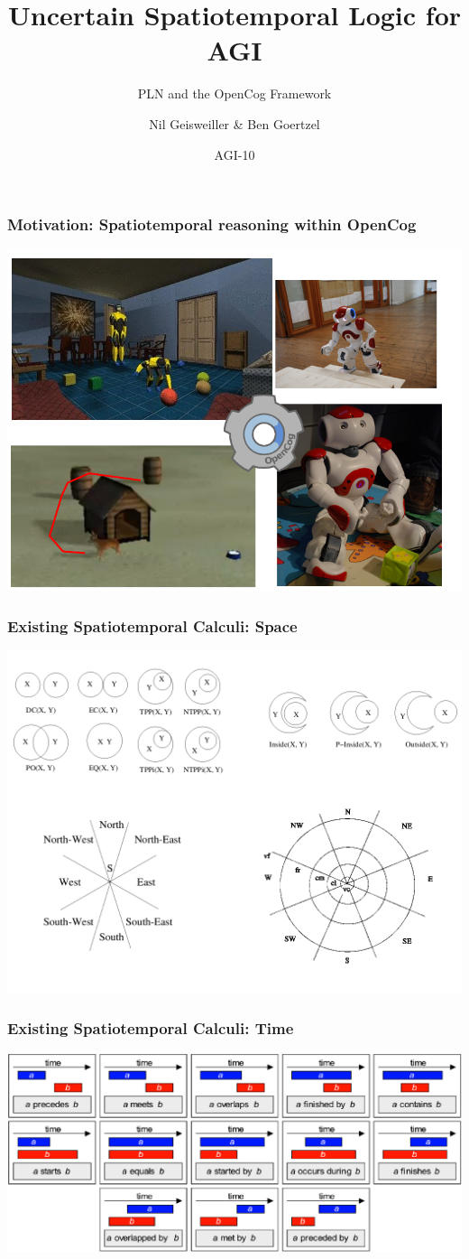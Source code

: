 \documentclass{beamer}
\title{Uncertain Spatiotemporal Logic for AGI}
\subtitle{PLN and the OpenCog Framework}
\author{Nil Geisweiller \& Ben Goertzel}
\institute[IDSIA] %
{
  Novamente LLC
}
\date[AGI-10] %
{AGI-10}
\begin{document}
\frame
{
  \maketitle
}

\frame
{
  \frametitle{Motivation: \alert{Spatiotemporal reasoning} within OpenCog}
  \includegraphics[scale=0.36]{opencog.png}
}

\frame
{
  \frametitle{Existing Spatiotemporal Calculi: \alert{Space}}
  \includegraphics[scale=0.36]{space.png}
}

\frame
{
  \frametitle{Existing Spatiotemporal Calculi: \alert{Time}}
  \includegraphics[scale=0.30]{Allen.png}
}
\end{document}

